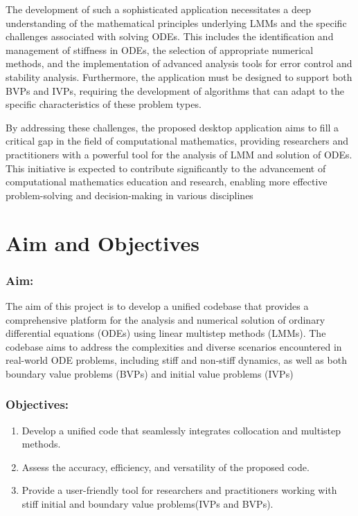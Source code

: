 The development of such a sophisticated application necessitates a deep understanding of the mathematical principles underlying LMMs and the specific challenges associated with solving ODEs. This includes the identification and management of stiffness in ODEs, the selection of appropriate numerical methods, and the implementation of advanced analysis tools for error control and stability analysis. Furthermore, the application must be designed to support both BVPs and IVPs, requiring the development of algorithms that can adapt to the specific characteristics of these problem types.

By addressing these challenges, the proposed desktop application aims to fill a critical gap in the field of computational mathematics, providing researchers and practitioners with a powerful tool for the analysis of LMM and solution of ODEs. This initiative is expected to contribute significantly to the advancement of computational mathematics education and research, enabling more effective problem-solving and decision-making in various disciplines

\section{Aim and Objectives}
\subsubsection{Aim:}
The aim of this project is to develop a unified codebase that provides a comprehensive platform for the analysis and numerical solution of ordinary differential equations (ODEs) using linear multistep methods (LMMs). The codebase aims to address the complexities and diverse scenarios encountered in real-world ODE problems, including stiff and non-stiff dynamics, as well as both boundary value problems (BVPs) and initial value problems (IVPs)
\subsubsection{Objectives:}
\begin{enumerate}
  \item Develop a unified code that seamlessly integrates collocation and multistep methods.
  \item Assess the accuracy, efficiency, and versatility of the proposed code.
  \item Provide a user-friendly tool for researchers and practitioners working with stiff initial and boundary value problems(IVPs and BVPs).
\end{enumerate}


